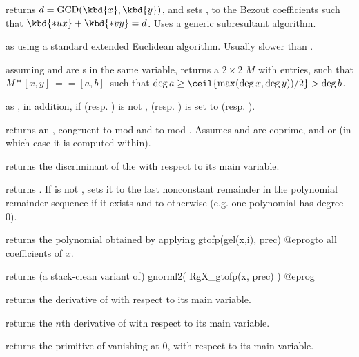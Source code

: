  returns
$d = \text{GCD}(\kbd{x},\kbd{y})$, and sets ,  to the Bezout
coefficients such that $\kbd{*ux} + \kbd{*vy} = d$. Uses a generic
subresultant algorithm.

 as
 using a standard extended Euclidean algorithm. Usually
slower than .

assuming  and  are s in the same variable,
returns a $2\times 2$  $M$ with  entries,
such that $M*[x,y]~==[a,b]~$ such that
$\deg a \geq \ceil{\max(\deg x,\deg y))/2} > \deg b$.

as , in addition, if  (resp. ) is not
,  (resp. )
is set to  (resp. ).

returns an , congruent to  mod  and to  mod
. Assumes  and  are coprime, and 
or  (in which case it is computed within).

 returns the discriminant of the  
with respect to its main variable.

 returns
. If  is not , sets it to the last
nonconstant remainder in the polynomial remainder sequence if it exists and to
 otherwise (e.g. one polynomial has degree 0).


 returns the polynomial obtained by
applying
\bprog
  gtofp(gel(x,i), prec)
@eprog\noindent to all coefficients of $x$.

 returns (a stack-clean variant of)
\bprog
  gnorml2( RgX_gtofp(x, prec) )
@eprog

 returns the derivative of  with respect to
its main variable.

 returns the $n$th derivative of  with respect to
its main variable.

 returns the primitive of  vanishing at
$0$, with respect to its main variable.

